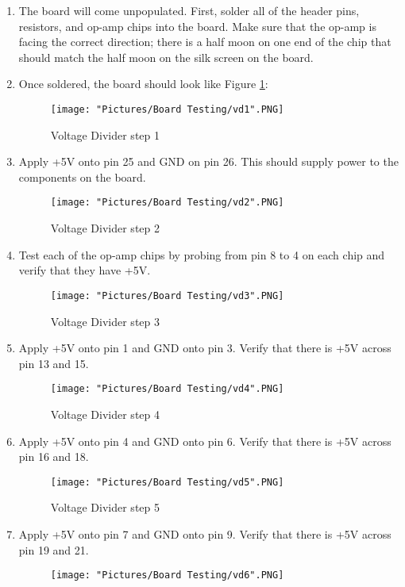 \documentclass[12pt]{article}
\begin{document}
\begin{enumerate}
	\item The board will come unpopulated. First, solder all of the header pins, resistors, and op-amp chips into the board. Make sure that the op-amp is facing the correct direction; there is a half moon on one end of the chip that should match the half moon on the silk screen on the board. 
	\item Once soldered, the board should look like Figure \ref{vd1}:
		\begin{figure}[H]
		 	\centering
			\texttt{[image: "Pictures/Board Testing/vd1".PNG]}
		 	\caption{Voltage Divider step 1}
			\label{vd1}
		\end{figure}
	\item Apply +5V onto pin 25 and GND on pin 26. This should supply power to the components on the board.
		\begin{figure}[H]
		 	\centering
			\texttt{[image: "Pictures/Board Testing/vd2".PNG]}
		 	\caption{Voltage Divider step 2}
			\label{vd2}
		\end{figure}
	\item Test each of the op-amp chips by probing from pin 8 to 4 on each chip and verify that they have +5V.
		\begin{figure}[H]
		 	\centering
			\texttt{[image: "Pictures/Board Testing/vd3".PNG]}
		 	\caption{Voltage Divider step 3}
			\label{vd3}
		\end{figure}
	\item Apply +5V onto pin 1 and GND onto pin 3. Verify that there is +5V across pin 13 and 15.
		\begin{figure}[H]
		 	\centering
			\texttt{[image: "Pictures/Board Testing/vd4".PNG]}
		 	\caption{Voltage Divider step 4}
			\label{vd4}
		\end{figure}
	\item Apply +5V onto pin 4 and GND onto pin 6. Verify that there is +5V across pin 16 and 18.
		\begin{figure}[H]
		 	\centering
			\texttt{[image: "Pictures/Board Testing/vd5".PNG]}
		 	\caption{Voltage Divider step 5}
			\label{vd5}
		\end{figure}
	\item Apply +5V onto pin 7 and GND onto pin 9. Verify that there is +5V across pin 19 and 21.
		\begin{figure}[H]
		 	\centering
			\texttt{[image: "Pictures/Board Testing/vd6".PNG]}

\end{figure}
\end{enumerate}
\end{document}
